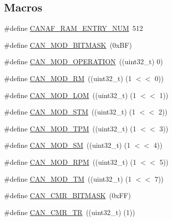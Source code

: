 \subsection*{Macros}
\begin{DoxyCompactItemize}
\item 
\#define \hyperlink{group__CAN__17XX__40XX_ga79546dad61d5645789e339371e9f491f}{C\-A\-N\-A\-F\-\_\-\-R\-A\-M\-\_\-\-E\-N\-T\-R\-Y\-\_\-\-N\-U\-M}~512
\item 
\#define \hyperlink{group__CAN__17XX__40XX_gadde236ce652b01b5854592cd4b40808e}{C\-A\-N\-\_\-\-M\-O\-D\-\_\-\-B\-I\-T\-M\-A\-S\-K}~(0x\-B\-F)
\item 
\#define \hyperlink{group__CAN__17XX__40XX_gac47f17c3134b87bbabc990411f21049d}{C\-A\-N\-\_\-\-M\-O\-D\-\_\-\-O\-P\-E\-R\-A\-T\-I\-O\-N}~((uint32\-\_\-t) 0)
\item 
\#define \hyperlink{group__CAN__17XX__40XX_gafd10049f6c1d6a63bfb481578d97de16}{C\-A\-N\-\_\-\-M\-O\-D\-\_\-\-R\-M}~((uint32\-\_\-t) (1 $<$$<$ 0))
\item 
\#define \hyperlink{group__CAN__17XX__40XX_ga4242a50d3797d3ea05304d81eb8fd891}{C\-A\-N\-\_\-\-M\-O\-D\-\_\-\-L\-O\-M}~((uint32\-\_\-t) (1 $<$$<$ 1))
\item 
\#define \hyperlink{group__CAN__17XX__40XX_ga0131118db0e68b5635a10777cbd794e7}{C\-A\-N\-\_\-\-M\-O\-D\-\_\-\-S\-T\-M}~((uint32\-\_\-t) (1 $<$$<$ 2))
\item 
\#define \hyperlink{group__CAN__17XX__40XX_gad8795757b9206a4daee0f5a40517385f}{C\-A\-N\-\_\-\-M\-O\-D\-\_\-\-T\-P\-M}~((uint32\-\_\-t) (1 $<$$<$ 3))
\item 
\#define \hyperlink{group__CAN__17XX__40XX_gab0cd0939676d3c6ce846e47cc8cc2b15}{C\-A\-N\-\_\-\-M\-O\-D\-\_\-\-S\-M}~((uint32\-\_\-t) (1 $<$$<$ 4))
\item 
\#define \hyperlink{group__CAN__17XX__40XX_gaec973a15597675e749f4033835dd66f9}{C\-A\-N\-\_\-\-M\-O\-D\-\_\-\-R\-P\-M}~((uint32\-\_\-t) (1 $<$$<$ 5))
\item 
\#define \hyperlink{group__CAN__17XX__40XX_ga0fc0c3414f4f0e4166e90e271631d89b}{C\-A\-N\-\_\-\-M\-O\-D\-\_\-\-T\-M}~((uint32\-\_\-t) (1 $<$$<$ 7))
\item 
\#define \hyperlink{group__CAN__17XX__40XX_ga5e4f3e4201311f127d98fff1b8eb2d3f}{C\-A\-N\-\_\-\-C\-M\-R\-\_\-\-B\-I\-T\-M\-A\-S\-K}~(0x\-F\-F)
\item 
\#define \hyperlink{group__CAN__17XX__40XX_ga4dc9265838852815dbea8a977cfa5331}{C\-A\-N\-\_\-\-C\-M\-R\-\_\-\-T\-R}~((uint32\-\_\-t) (1))
\item 
$$
\end{DoxyCompactItemize}
